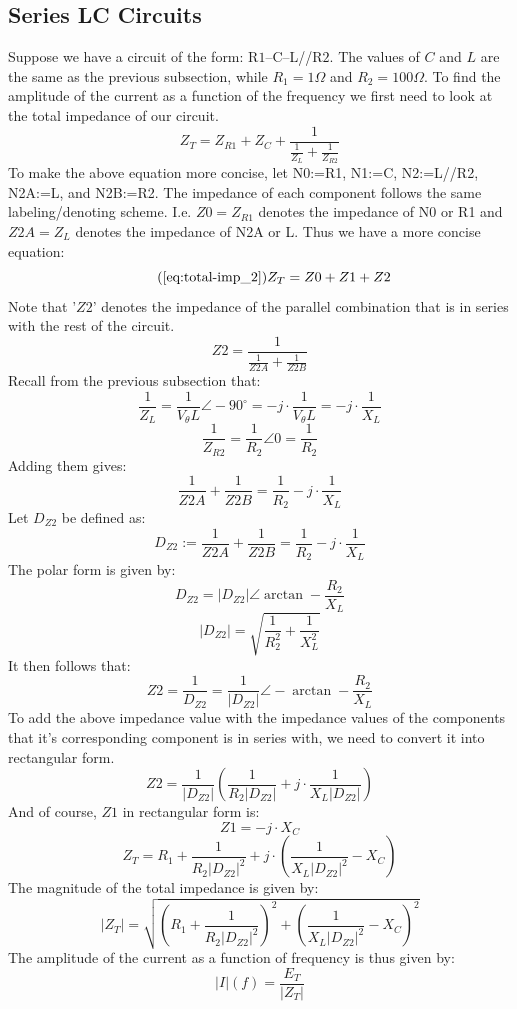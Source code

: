 \documentclass{article}
\begin{document}
	\subsection[LC Series]{Series LC Circuits}
	Suppose we have a circuit of the form: $\text{R1}$--C--L//$\text{R2}$.  
	The values of $C$ 
	and $L$ are the same as the previous subsection, while $R_1=1\Omega$ and 
	$R_2=100\Omega$.  To find the amplitude of the current as a function of the 
	frequency we first need to look at the total impedance of our circuit.
	\begin{equation}\label{eq:total-imp_2}
		Z_T = Z_{R1} + Z_C + \frac{1}{\frac{1}{Z_L} + \frac{1}{Z_{R2}}}
	\end{equation}
	To make the above equation more concise, let N0:=R1, N1:=C, N2:=L//R2, 
	N2A:=L, and N2B:=R2.  The impedance of each component follows the same 
	labeling/denoting scheme.  I.e. $Z0=Z_{R1}$ denotes the impedance of N0 or 
	R1 and $Z2A=Z_L$ denotes the impedance of N2A or L.  Thus we have a more 
	concise equation:
	\begin{equation}\tag{\ref{eq:total-imp_2}}
		Z_T = Z0 + Z1 + Z2
	\end{equation} 
	Note that '$Z2$' denotes the impedance of the parallel combination that is 
	in series with the rest of the circuit.
	$$ Z2 = \frac{1}{\frac{1}{Z2A} + \frac{1}{Z2B}}$$
	Recall from the previous subsection that:
	$$ \frac{1}{Z_L} = \frac{1}{V_\theta L}\angle-90^{\circ} = - j \cdot 
	\frac{1}{V_\theta L} = - j \cdot \frac{1}{X_L}$$
	$$ \frac{1}{Z_{R2}} = \frac{1}{R_2}\angle0 = \frac{1}{R_2}$$
	Adding them gives:
	$$ \frac{1}{Z2A} + \frac{1}{Z2B} = \frac{1}{R_2} - j \cdot \frac{1}{X_L}$$
	Let $D_{Z2}$ be defined as:
	$$ D_{Z2} := \frac{1}{Z2A} + \frac{1}{Z2B}= \frac{1}{R_2} - j \cdot 
	\frac{1}{X_L}$$
	The polar form is given by:
	$$ D_{Z2} = |D_{Z2}|\angle\arctan - \frac{R_2}{X_L}$$
	$$ |D_{Z2}| = \sqrt{\frac{1}{R_2^2} + \frac{1}{X_L^2}}$$
	It then follows that:
	$$ Z2 = \frac{1}{D_{Z2}} = \frac{1}{|D_{Z2}|}\angle-\arctan - 
	\frac{R_2}{X_L}$$
	To add the above impedance value with the impedance values of the 
	components that it's corresponding component is in series with, we need to 
	convert it into rectangular form.
	$$ Z2 = \frac{1}{|D_{Z2}|}\left( \frac{1}{R_2 |D_{Z2}|} + j \cdot 
	\frac{1}{X_L |D_{Z2}|} \right)$$
	And of course, $Z1$ in rectangular form is:
	$$ Z1 = - j \cdot X_C$$
	$$ Z_T = R_1 + \frac{1}{R_2|D_{Z2}|^2} + j \cdot \left( 
	\frac{1}{X_L|D_{Z2}|^2} - X_C \right)$$
	The magnitude of the total impedance is given by:
	\begin{equation}\label{eq:mag-total-imp_2}
		|Z_T| = \sqrt{\left( R_1 + \frac{1}{R_2|D_{Z2}|^2} \right)^2 + \left( 
		\frac{1}{X_L|D_{Z2}|^2} - X_C \right)^2}
	\end{equation}
	The amplitude of the current as a function of frequency is thus given by:
	$$ |I|(f) = \frac{E_T}{|Z_T|}$$
\end{document}
